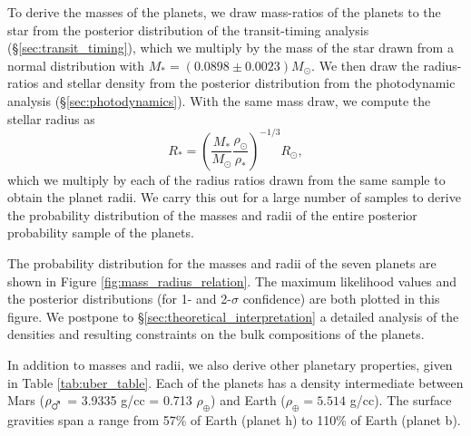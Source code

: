 \documentclass[twocolumn]{aastex63}
\begin{document}
To derive the masses of the planets, we draw mass-ratios of the planets to the star from the posterior distribution of the transit-timing analysis (\S \ref{sec:transit_timing}), which we multiply by the mass of the star drawn from a normal distribution with $M_* = (0.0898\pm 0.0023) M_\odot$. We then draw the radius-ratios and stellar density from the posterior distribution from the photodynamic analysis (\S \ref{sec:photodynamics}).
With the same mass draw, we compute the stellar radius as
\begin{equation}
    R_* = \left(\frac{M_*}{M_\odot}\frac{\rho_\odot}{\rho_*}\right)^{-1/3} R_\odot,
\end{equation}
which we multiply by each of the radius ratios drawn from the same sample to obtain the planet radii.   We carry this out for a large number of samples to derive the probability distribution of the masses and radii of the entire posterior probability sample of the planets.

The probability distribution for the masses and radii of the seven planets are shown in Figure \ref{fig:mass_radius_relation}.  The maximum likelihood values and the posterior distributions (for 1- and 2-$\sigma$ confidence) are both plotted in this figure.  We postpone to \S\ref{sec:theoretical_interpretation} a detailed analysis of the densities and resulting constraints on the bulk compositions of the planets.

In addition to masses and radii, we also derive other planetary properties,
given in Table \ref{tab:uber_table}.  Each of the planets has a density
intermediate between Mars ($\rho_{\mars}$ = 3.9335 g/cc = 0.713 $\rho_\oplus$) and
Earth ($\rho_\oplus = 5.514$ g/cc).  The surface gravities span a range
from 57\% of Earth (planet h) to 110\% of Earth (planet b).
\end{document}
